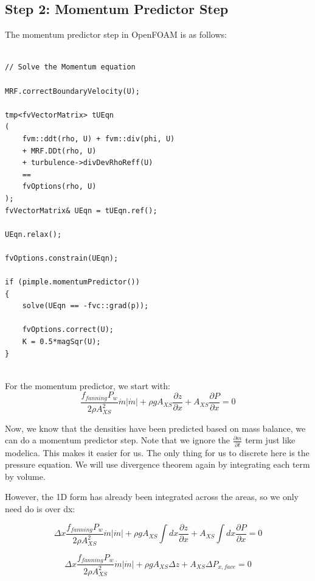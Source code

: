\documentclass[masters]{ucbthesis}
\renewcommand{\_}{\kern-1.5pt\textunderscore\kern-1.5pt}
\begin{document}
\subsection{Step 2: Momentum Predictor Step}

The momentum predictor step in OpenFOAM is as follows:
\begin{lstlisting}
	
// Solve the Momentum equation

MRF.correctBoundaryVelocity(U);

tmp<fvVectorMatrix> tUEqn
(
	fvm::ddt(rho, U) + fvm::div(phi, U)
	+ MRF.DDt(rho, U)
	+ turbulence->divDevRhoReff(U)
	==
	fvOptions(rho, U)
);
fvVectorMatrix& UEqn = tUEqn.ref();

UEqn.relax();

fvOptions.constrain(UEqn);

if (pimple.momentumPredictor())
{
	solve(UEqn == -fvc::grad(p));

	fvOptions.correct(U);
	K = 0.5*magSqr(U);
}


\end{lstlisting}
For the momentum predictor, we start with:
\begin{equation*} 
	\frac{f_{fanning} P_w}{2 \rho A_{XS}^2} \dot{m} |\dot{m}|
	+ \rho g A_{XS} \frac{\partial z}{\partial x}
	+ A_{XS} \frac{\partial P}{\partial x} = 0
\end{equation*}

Now, we know that the densities have been predicted based on mass balance,
we can do a momentum predictor step. Note that we ignore the 
$\frac{\partial \dot{m}}{\partial t}$ term just like modelica. This makes it 
easier for us. The only thing for us to discrete here is the pressure 
equation. We will use divergence theorem again by integrating each term 
by volume.

However, the 1D form has already been integrated across the areas,
so we only need do is over dx:

\begin{equation*} 
	\Delta x \frac{f_{fanning} P_w}{2 \rho A_{XS}^2} \dot{m} |\dot{m}|
	+\rho g A_{XS} \int dx  \frac{\partial z}{\partial x} 
	+ A_{XS} \int dx  \frac{\partial P}{\partial x} = 0
\end{equation*}

\begin{equation*} 
	\Delta x \frac{f_{fanning} P_w}{2 \rho A_{XS}^2} \dot{m} |\dot{m}|
	+\rho g A_{XS} \Delta z
	+ A_{XS} \Delta P_{x,face} = 0
\end{equation*}
\end{document}
